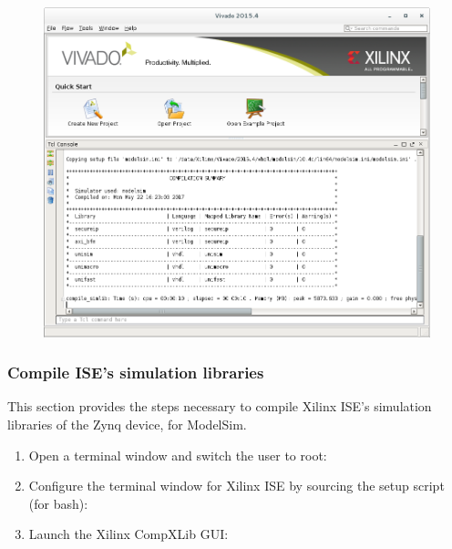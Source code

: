 \begin{flushleft}
\begin{flushleft}
\begin{enumerate}
\begin{figure}[H]
	\end{figure}
	\begin{figure}[H]
	\centering\captionsetup{type=figure}\includegraphics[scale=0.5]{figures/xilinx_vivado_2015_compsimlib_out}
	\end{figure}
		\end{enumerate}
\end{flushleft}
\subsubsection{Compile ISE's simulation libraries}
	This section provides the steps necessary to compile Xilinx ISE's simulation libraries of the Zynq device, for ModelSim.

\begin{flushleft}
	\begin{enumerate}
	 	\item Open a terminal window and switch the user to root:
			\subitem {}
		\item Configure the terminal window for Xilinx ISE by sourcing the setup script (for bash):
			\subitem {}
			\subitem {}
		\item Launch the Xilinx CompXLib GUI:
			\subitem {}
			\subitem {}


\end{enumerate}
\end{flushleft}
\end{flushleft}
